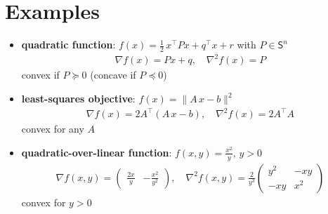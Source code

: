 \documentclass[11pt]{extarticle}
\newcommand{\ds}{\displaystyle}
\theoremstyle{definition}
\begin{document}
\newpage

\section*{Examples}

\begin{itemize}
  \item {\bf quadratic function}: $\ds f(x) = \frac{1}{2}\,x^\top P x + q^\top x + r$ with $P\in\mathsf{S}^n$ 
    \begin{align*}
      \nabla f(x) = P x + q,\quad \nabla^2 f(x) = P
    \end{align*}
    convex if $P\succcurlyeq 0$ (concave if $P\preccurlyeq 0$)
  \item {\bf least-squares objective}: $\ds f(x) = \|A\,x - b\|^2$ 
    \begin{align*}
      \nabla f(x) = 2A^\top(A\,x - b),\quad \nabla^2 f(x) = 2 A^\top A 
    \end{align*}
    convex for any $A$
  \item {\bf quadratic-over-linear function}: $\ds f(x, y) = \frac{x^2}{y}$, $y > 0$ 
    \begin{align*}
      \nabla f(x, y) = \begin{pmatrix}\frac{2x}{y} & -\frac{x^2}{y^2}\end{pmatrix},\quad \nabla^2 f(x, y) = \frac{2}{y^3}\begin{pmatrix}y^2 & -xy \\ -xy & x^2 \end{pmatrix}
    \end{align*}
    convex for $y > 0$
\end{itemize}

\newpage
\end{document}
